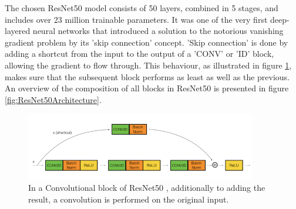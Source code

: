 The chosen ResNet50 model \citep{Dwivedi:2019:ResNetInKeras} consists of 50 layers, combined in 5 stages, and includes over 23 million trainable parameters. It was one of the very first deep-layered neural networks that introduced a solution to the notorious vanishing gradient problem by its 'skip connection' concept.
\newline\newline
'Skip connection' is done by adding a shortcut from the input to the output of a 'CONV' or 'ID' block, allowing the gradient to flow through. This behaviour, as illustrated in figure \ref{fig:ResNet50ConvBlock}, makes sure that the subsequent block performs as least as well as the previous. An overview of the composition of all blocks in ResNet50 is presented in figure \ref{fig:ResNet50Architecture}. 

\begin{figure}[H]
  \begin{center}
  \includegraphics[angle=0, width=0.9\textwidth]{Figures/ResNet50_ConvBlock.png}
  \caption{In a Convolutional block of ResNet50 \citep{Dwivedi:2019:ResNetInKeras}, additionally to adding the result, a convolution is performed on the original input.}
  \label{fig:ResNet50ConvBlock}
  \end{center}
\end{figure}



